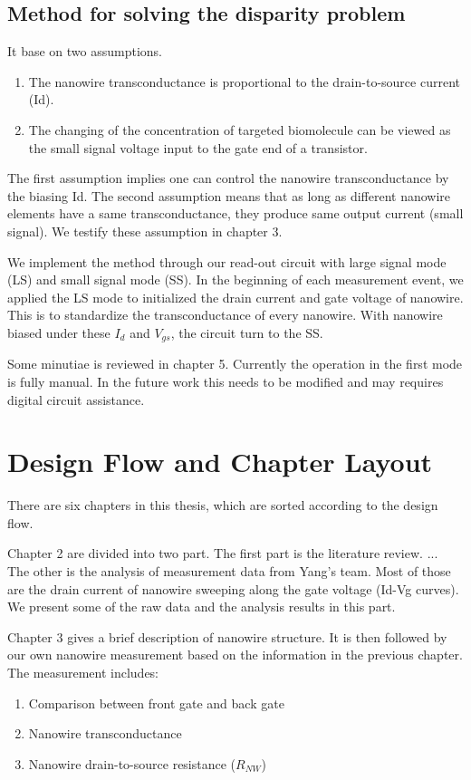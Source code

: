 \subsection*{Method for solving the disparity problem}
It base on two assumptions.
\begin{enumerate}
    \item The nanowire transconductance is proportional to the drain-to-source current (Id).
    \item The changing of the concentration of targeted biomolecule can be viewed as the small signal voltage input to the gate end of a transistor.
\end{enumerate}
The first assumption implies one can control the nanowire transconductance by the biasing Id.
The second assumption means that as long as different nanowire elements have a same transconductance, they produce same output current (small signal).
We testify these assumption in chapter 3.

We implement the method through our read-out circuit with large signal mode (LS) and small signal mode (SS).
In the beginning of each measurement event, we applied the LS mode to initialized the drain current and gate voltage of nanowire.
This is to standardize the transconductance of every nanowire.
With nanowire biased under these $I_d$ and $V_{gs}$, the circuit turn to the SS.

Some minutiae is reviewed in chapter 5.
Currently the operation in the first mode is fully manual.
In the future work this needs to be modified and may requires digital circuit assistance.


\section{Design Flow and Chapter Layout}
There are six chapters in this thesis, which are sorted according to the design flow.

Chapter 2 are divided into two part.
The first part is the literature review. {\color{red}...} The other is the analysis of measurement data from Yang's team.
Most of those are the drain current of nanowire sweeping along the gate voltage (Id-Vg curves).
We present some of the raw data and the analysis results in this part.

Chapter 3 gives a brief description of nanowire structure.
It is then followed by our own nanowire measurement based on the information in the previous chapter.
The measurement includes:

\begin{enumerate}
\item Comparison between front gate and back gate
\item Nanowire transconductance
\item Nanowire drain-to-source resistance ($R_{NW}$)
\end{enumerate}

